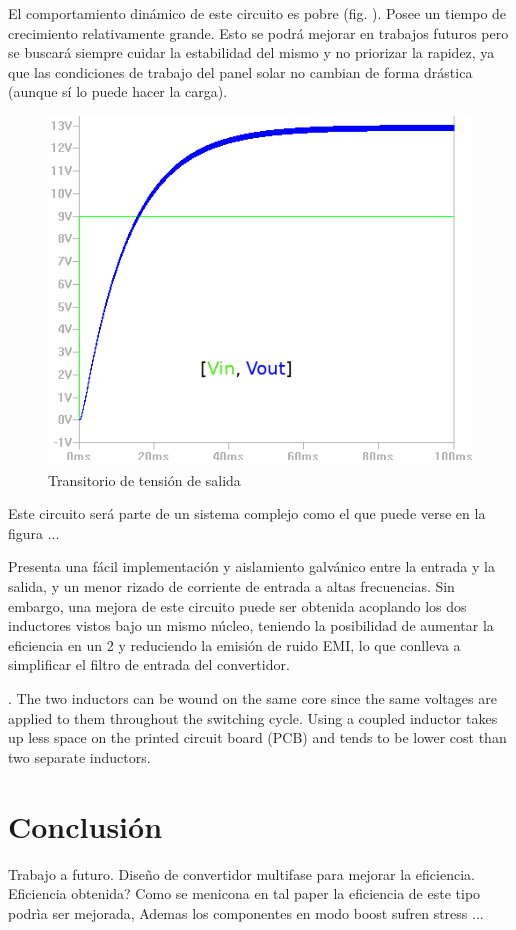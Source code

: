    
    El comportamiento dinámico de este circuito es pobre (fig. ). Posee un tiempo de crecimiento relativamente grande. Esto se podrá mejorar en trabajos futuros pero se buscará siempre cuidar la estabilidad del mismo y no priorizar la rapidez, ya que las condiciones de trabajo del panel solar no cambian de forma drástica (aunque sí lo puede hacer la carga). 
    
    \begin{figure}[htbp]
            \centering
             \includegraphics[scale = 0.3]{Figuras/Transitorio_Vin9V.png}
            \caption{ Transitorio de tensión de salida }
            \label{fig: transitorio Vout}
      \end{figure}
   
    
    Este circuito será parte de un sistema complejo como el que puede verse en la figura ... 
    
Presenta una fácil implementación y
aislamiento galvánico entre la entrada y la salida, y un menor rizado de corriente
de entrada a altas frecuencias. Sin embargo, una mejora de este circuito puede
ser obtenida acoplando los dos inductores vistos bajo un mismo núcleo, teniendo
la posibilidad de aumentar la eficiencia en un 2 y reduciendo la emisión de ruido
EMI, lo que conlleva a simplificar el filtro de entrada del convertidor.

.
The
two inductors can be wound on the same core since
the same voltages are applied to them throughout the
switching cycle. Using a coupled inductor takes up
less space on the printed circuit board (PCB) and
tends to be lower cost than two separate inductors.
 
\section{Conclusión}

Trabajo a futuro. Diseño de convertidor multifase para mejorar la eficiencia. 
Eficiencia obtenida? 
Como se menicona en tal paper la eficiencia de este tipo podrìa ser mejorada, Ademas los componentes en modo boost sufren stress ... 




\nocite{*}





